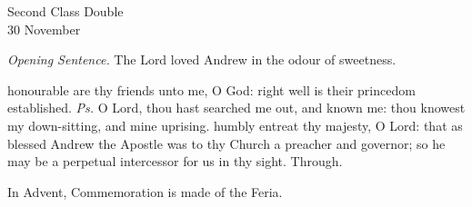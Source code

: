 \fancyhead[RO,LE]{}
\fancyhead[RE,LO]{}
{}
\begin{inhead}
    {Second Class Double\\
30 November}
\end{inhead}
\par\noindent
\textit{Opening Sentence.} The Lord loved Andrew in the odour of sweetness.

\introit
{} honourable are thy friends unto me, O God: right well is their princedom established. \textit{Ps.} O Lord, thou hast searched me out, and known me: thou knowest my down-sitting, and mine uprising.
\collect
 humbly entreat thy majesty, O Lord: that as blessed Andrew the Apostle was to thy Church a preacher and governor; so he may be a perpetual intercessor for us in thy sight. Through.

\begin{rubric}
    In Advent, Commemoration is made of the Feria.
\end{rubric}

